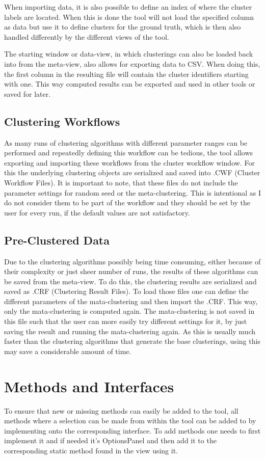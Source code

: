 \documentclass[
	a4paper,
	english,
	twoside,
	openright,               
	11pt                            
	]{report}
\begin{document}
When importing data, it is also possible to define an index of where the cluster labels are located. When this is done the tool will not load the specified column as data but use it to define clusters for the ground truth, which is then also handled differently by the different views of the tool.

The starting window or data-view, in which clusterings can also be loaded back into from the meta-view, also allows for exporting data to CSV. When doing this, the first column in the resulting file will contain the cluster identifiers starting with one. This way computed results can be exported and used in other tools or saved for later.

\subsection{Clustering Workflows}
As many runs of clustering algorithms with different parameter ranges can be performed and repeatedly defining this workflow can be tedious, the tool allows exporting and importing these workflows from the cluster workflow window. For this the underlying clustering objects are serialized and saved into .CWF (Cluster Workflow Files). It is important to note, that these files do not include the parameter settings for random seed or the meta-clustering. This is intentional as I do not consider them to be part of the workflow and they should be set by the user for every run, if the default values are not satisfactory.

\subsection{Pre-Clustered Data}
Due to the clustering algorithms possibly being time consuming, either because of their complexity or just sheer number of runs, the results of these algorithms can be saved from the meta-view. To do this, the clustering results are serialized and saved as .CRF (Clustering Result Files). To load those files one can define the different parameters of the mata-clustering and then import the .CRF. This way, only the mata-clustering is computed again. The mata-clustering is not saved in this file such that the user can more easily try different settings for it, by just saving the result and running the mata-clustering again. As this is usually much faster than the clustering algorithms that generate the base clusterings, using this may save a considerable amount of time.

\section{Methods and Interfaces}
To ensure that new or missing methods can easily be added to the tool, all methods where a selection can be made from within the tool can be added to by implementing onto the corresponding interface. To add methods one needs to first implement it and if needed it's OptionsPanel and then add it to the corresponding static method found in the view using it.
\end{document}
